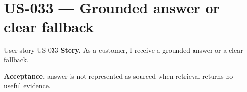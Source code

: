 \Needspace{640pt}
\section{US-033 --- Grounded answer or clear fallback}

\begin{storybox}{User story US-033}
\textbf{Story.} As a customer, I receive a grounded answer or a clear fallback.\par
\textbf{Acceptance.} answer is not represented as sourced when retrieval returns no useful evidence.
\end{storybox}




